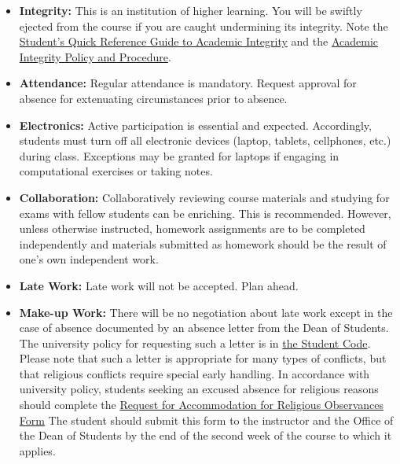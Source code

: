 \documentclass[11pt]{article}
\begin{document}
\begin{itemize}
\item[] \textbf{Integrity:} This is an institution of higher
learning. You will be swiftly ejected from the course if you are caught
undermining its integrity. Note the
\href{http://www.provost.illinois.edu/academicintegrity/students.html}{Student's
Quick Reference Guide to Academic Integrity} and the
\href{http://studentcode.illinois.edu/article1_part4_1-401.html}{Academic
Integrity Policy and Procedure}.
\item[] \textbf{Attendance:} Regular attendance is mandatory. Request approval for absence for extenuating circumstances prior to absence.
\item[] \textbf{Electronics:} Active participation is essential and expected.
        Accordingly, students must turn off all electronic devices (laptop,
        tablets, cellphones, etc.) during class. Exceptions may be granted for
        laptops if engaging in computational exercises or taking notes.
\item[] \textbf{Collaboration:} Collaboratively reviewing course materials and studying for exams with fellow students can be enriching.  This is recommended.  However, unless otherwise instructed, homework assignments are to be completed independently and materials submitted as homework should be the result of one's own independent work.
\item[] \textbf{Late Work:} Late work will not be accepted. Plan ahead.

\item[] \textbf{Make-up Work:} There will be no negotiation about late work
        except in the case of absence documented by an absence letter from the
        Dean of Students.  The university policy for requesting such a letter
        is in
        \href{http://studentcode.illinois.edu/article1_part5_1-501.html}{the
        Student Code}. Please note that such a letter is appropriate for many
        types of conflicts, but that religious conflicts require special early
        handling. In accordance with university policy, students seeking an
        excused absence for religious reasons should complete the
	\href{http://odos.illinois.edu/community-of-care/resources/students/religious-observances/}{Request for Accommodation for Religious Observances Form}
        The student should submit this
        form to the instructor and the Office of the Dean of Students by the end of the
        second week of the course to which it applies.



\end{itemize}
\end{document}
